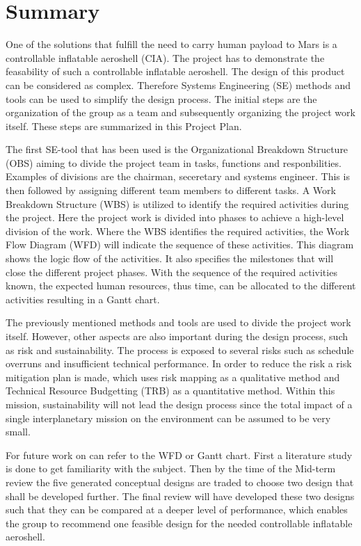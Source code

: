 \section*{Summary}\label{cha:summary}
One of the solutions that fulfill the need to carry human payload to Mars is a controllable inflatable aeroshell (CIA). The project has to demonstrate the feasability of such a controllable inflatable aeroshell. The design of this product can be considered as complex. Therefore Systems Engineering (SE) methods and tools can be used to simplify the design process. The initial steps are the organization of the group as a team and subsequently organizing the project work itself. These steps are summarized in this Project Plan.

The first SE-tool that has been used is the Organizational Breakdown Structure (OBS) aiming to divide the project team in tasks, functions and responbilities. Examples of divisions are the chairman, seceretary and systems engineer. This is then followed by assigning different team members to different tasks. A Work Breakdown Structure (WBS) is utilized to identify the required activities during the project. Here the project work is divided into phases to achieve a high-level division of the work. Where the WBS identifies the required activities, the Work Flow Diagram (WFD) will indicate the sequence of these activities. This diagram shows the logic flow of the activities. It also specifies the milestones that will close the different project phases. With the sequence of the required activities known, the expected human resources, thus time, can be allocated to the different activities resulting in a Gantt chart. 

The previously mentioned methods and tools are used to divide the project work itself. However, other aspects are also important during the design process, such as risk and sustainability. The process is exposed to several risks such as schedule overruns and insufficient technical performance. In order to reduce the risk a risk mitigation plan is made, which uses risk mapping as a qualitative method and Technical Resource Budgetting (TRB) as a quantitative method. Within this mission, sustainability will not lead the design process since the total impact of a single interplanetary mission on the environment can be assumed to be very small.

For future work on can refer to the WFD or Gantt chart. First a literature study is done to get familiarity with the subject. Then by the time of the Mid-term review the five generated conceptual designs are traded to choose two design that shall be developed further. The final review will have developed these two designs such that they can be compared at a deeper level of performance, which enables the group to recommend one feasible design for the needed controllable inflatable aeroshell.